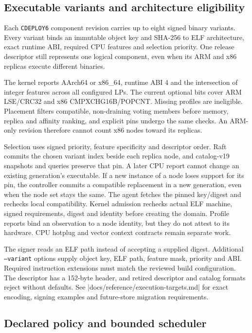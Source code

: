 \subsection{Executable variants and architecture eligibility}

Each \texttt{CDEPLOY6} component revision carries up to eight signed binary
variants. Every variant binds an immutable object key and SHA-256 to ELF
architecture, exact runtime ABI, required CPU features and selection priority.
One release descriptor still represents one logical component, even when its
ARM and x86 replicas execute different binaries.

The kernel reports AArch64 or x86\_64, runtime ABI 4 and the intersection of
integer features across all configured LPs. The current optional bits cover
ARM LSE/CRC32 and x86 CMPXCHG16B/POPCNT. Missing profiles are ineligible.
Placement filters compatible, non-draining voting members before memory,
replica and affinity ranking, and explicit pins undergo the same checks.
An ARM-only revision therefore cannot count x86 nodes toward its replicas.

Selection uses signed priority, feature specificity and descriptor order.
Raft commits the chosen variant index beside each replica node, and catalog-v19
snapshots and queries preserve that pin. A later CPU report cannot change an
existing generation's executable. If a new instance of a node loses support for
its pin, the controller commits a compatible replacement in a new generation,
even when the node set stays the same. The agent fetches the pinned key/digest and
rechecks local compatibility. Kernel admission rechecks actual ELF machine,
signed requirements, digest and identity before creating the domain. Profile
reports bind an observation to a node identity, but they do not attest to its hardware.
CPU hotplug and vector context contracts remain separate work.

The signer reads an ELF path instead of accepting a supplied digest.
Additional \texttt{--variant} options supply object key, ELF path, feature mask,
priority and ABI. Required instruction extensions must match the reviewed build
configuration. The descriptor has a 152-byte header, and retired descriptor and
catalog formats reject without defaults. See
\repofile|docs/reference/execution-targets.md| for exact encoding, signing
examples and future-store migration requirements.

\subsection{Declared policy and bounded scheduler}

